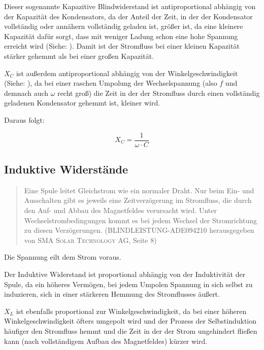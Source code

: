 \noindent Dieser sogenannte \glqq Kapazitive Blindwiderstand\grqq{} ist antiproportional abhängig von der Kapazität des Kondensators, da der Anteil der Zeit, in der der Kondensator vollständig oder annähern vollständig geladen ist, größer ist, da eine kleinere Kapazität dafür sorgt, dass mit weniger Ladung schon eine hohe Spannung erreicht wird (Siehe: ). Damit ist der Stromfluss bei einer kleinen Kapazität stärker gehemmt als bei einer großen Kapazität. 

$X_C$ ist außerdem antiproportional abhängig von der Winkelgeschwindigkeit (Siehe: ), da bei einer raschen Umpolung der Wechselspannung (also $f$ und demnach auch $\omega$ recht groß) die Zeit in der der Stromfluss durch einen vollständig geladenen Kondensator gehemmt ist, kleiner wird.

Daraus folgt:

\begin{equation}	\label{eq:KapazitiverWiderstand}
	X_C = \frac{1}{\omega \cdot C}
\end{equation}


\subsection{Induktive Widerstände}		\label{subsec:InduktiverWiderstand}

\begin{quote}
Eine Spule leitet Gleichstrom wie ein normaler Draht. Nur beim Ein- und Ausschalten gibt es jeweils eine Zeitverzögerung im Stromfluss, die durch den Auf- und Abbau des Magnetfeldes verursacht wird. Unter Wechselstrombedingungen kommt es bei jedem Wechsel der Stromrichtung zu diesen Verzögerungen. (\glqq BLINDLEISTUNG-ADE094210\grqq{} herausgegeben von \textsc{SMA Solar Technology AG}, Seite 8)
\end{quote}

\noindent \glqq Die Spannung eilt dem Strom voraus.\grqq

\vspace{11pt}

Der \glqq Induktive Widerstand\grqq{} ist proportional abhängig von der Induktivität der Spule, da ein höheres Vermögen, bei jedem Umpolen Spannung in sich selbst zu induzieren, sich in einer stärkeren Hemmung des Stromflusses äußert.

$X_L$ ist ebenfalls proportional zur Winkelgeschwindigkeit, da bei einer höheren Winkelgeschwindigkeit öfters umgepolt wird und der Prozess der Selbstinduktion häufiger den Stromfluss hemmt und die Zeit in der der Strom ungehindert fließen kann (nach vollständigem Aufbau des Magnetfeldes) kürzer wird.

